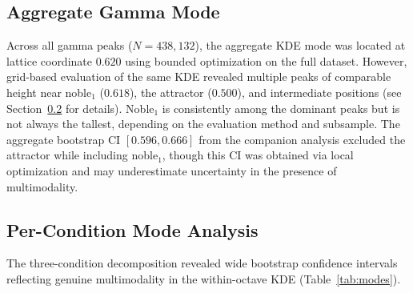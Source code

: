 \documentclass[11pt,a4paper]{article}
\begin{document}
\subsection{Aggregate Gamma Mode}
\label{sec:gamma_aggregate}

Across all gamma peaks ($N = 438,132$), the aggregate KDE mode was located at lattice coordinate $0.620$ using bounded optimization on the full dataset. However, grid-based evaluation of the same KDE revealed multiple peaks of comparable height near noble$_1$ ($0.618$), the attractor ($0.500$), and intermediate positions (see Section~\ref{sec:mode_shifts} for details). Noble$_1$ is consistently among the dominant peaks but is not always the tallest, depending on the evaluation method and subsample. The aggregate bootstrap CI $[0.596, 0.666]$ from the companion analysis \parencite{lacy2026golden} excluded the attractor while including noble$_1$, though this CI was obtained via local optimization and may underestimate uncertainty in the presence of multimodality.

\subsection{Per-Condition Mode Analysis}
\label{sec:mode_shifts}

The three-condition decomposition revealed wide bootstrap confidence intervals reflecting genuine multimodality in the within-octave KDE (Table~\ref{tab:modes}).
\end{document}
